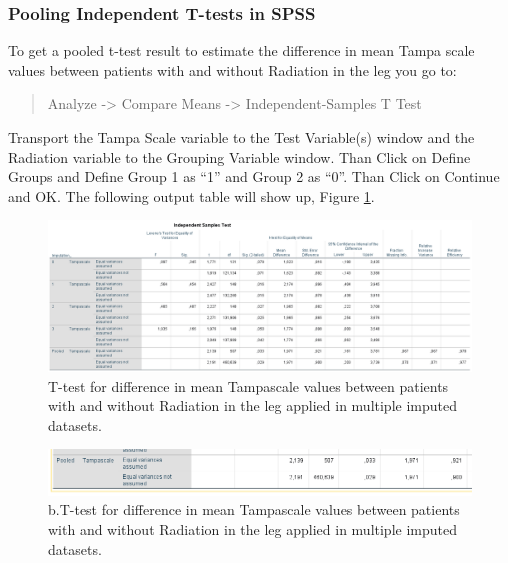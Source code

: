 \documentclass[
]{book}
\begin{document}
\hypertarget{pooling-independent-t-tests-in-spss}{%
\subsubsection{Pooling Independent T-tests in SPSS}\label{pooling-independent-t-tests-in-spss}}

To get a pooled t-test result to estimate the difference in mean Tampa scale values between patients with and without Radiation in the leg you go to:

\begin{quote}
Analyze -\textgreater{} Compare Means -\textgreater{} Independent-Samples T Test
\end{quote}

Transport the Tampa Scale variable to the Test Variable(s) window and the Radiation variable to the Grouping Variable window. Than Click on Define Groups and Define Group 1 as ``1'' and Group 2 as ``0''. Than Click on Continue and OK. The following output table will show up, Figure \ref{fig:tab5-1a}.

\begin{figure}

{\centering \includegraphics[width=0.9\linewidth]{images/table5.1} 

}

\caption{T-test for difference in mean Tampascale values between patients with and without Radiation in the leg applied in multiple imputed datasets.}\label{fig:tab5-1a}
\end{figure}

\begin{figure}

{\centering \includegraphics[width=0.9\linewidth]{images/table5.1b} 

}

\caption{b.T-test for difference in mean Tampascale values between patients with and without Radiation in the leg applied in multiple imputed datasets.}\label{fig:tab5-1b}
\end{figure}
\end{document}
